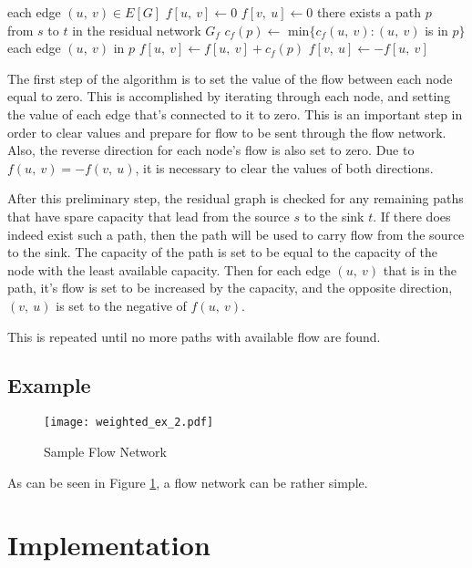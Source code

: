\documentclass[conference]{IEEEtran}
\begin{document}
\begin{codebox}
\li \For each edge $(u,\ v) \in E[G]$
\li \Do $f[u,\ v] \leftarrow 0$
\li $f[v,\ u] \leftarrow 0$
\End
\li \While there exists a path $p$ \\from $s$ to $t$ in the residual network $G_f$
\li \Do $c_f(p) \leftarrow$ min$\{c_f(u,\ v) : (u,\ v)$ is in $p\}$
\li \For each edge $(u,\ v)$ in $p$
\li \Do $f[u,\ v] \leftarrow f[u,\ v] + c_f(p)$
\li $f[v,\ u] \leftarrow - f[u,\ v]$
\End
\end{codebox}

The first step of the algorithm is to set the value of the flow between each node equal to zero. This is accomplished by iterating through each node, and setting the value of each edge that's connected to it to zero. This is an important step in order to clear values and prepare for flow to be sent through the flow network. Also, the reverse direction for each node's flow is also set to zero. Due to $f(u,\ v) = - f(v,\ u)$, it is necessary to clear the values of both directions.

After this preliminary step, the residual graph is checked for any remaining paths that have spare capacity that lead from the source $s$ to the sink $t$. If there does indeed exist such a path, then the path will be used to carry flow from the source to the sink. The capacity of the path is set to be equal to the capacity of the node with the least available capacity. Then for each edge $(u,\ v)$ that is in the path, it's flow is set to be increased by the capacity, and the opposite direction, $(v,\ u)$ is set to the negative of $f(u,\ v)$.

This is repeated until no more paths with available flow are found.

\subsection{Example}
\begin{figure}[t]                     
\centering                             
\texttt{[image: weighted\_ex\_2.pdf]}
\caption{Sample Flow Network}           
\label{fig:network1}                        
\end{figure}                           

As can be seen in Figure \ref{fig:network1}, a flow network can be rather simple.


\section{Implementation}
\end{document}
